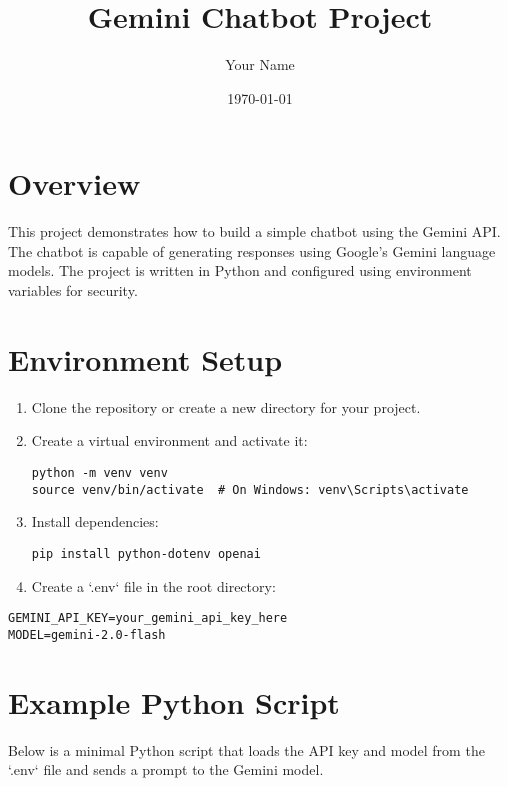 \documentclass[12pt]{article}
\title{Gemini Chatbot Project}
\author{Your Name}
\date{\today}
\begin{document}
\maketitle

\section*{Overview}
This project demonstrates how to build a simple chatbot using the Gemini API. The chatbot is capable of generating responses using Google’s Gemini language models. The project is written in Python and configured using environment variables for security.

\section*{Environment Setup}

\begin{enumerate}[label=\arabic*.]
  \item Clone the repository or create a new directory for your project.
  \item Create a virtual environment and activate it:
  \begin{verbatim}
python -m venv venv
source venv/bin/activate  # On Windows: venv\Scripts\activate
  \end{verbatim}

  \item Install dependencies:
  \begin{verbatim}
pip install python-dotenv openai
  \end{verbatim}
  
  \item Create a `.env` file in the root directory:
\end{enumerate}

\begin{tcolorbox}[colback=black!5!white, colframe=black!75!black, title=.env file]
\begin{verbatim}
GEMINI_API_KEY=your_gemini_api_key_here
MODEL=gemini-2.0-flash
\end{verbatim}
\end{tcolorbox}

\section*{Example Python Script}
Below is a minimal Python script that loads the API key and model from the `.env` file and sends a prompt to the Gemini model.
\end{document}
